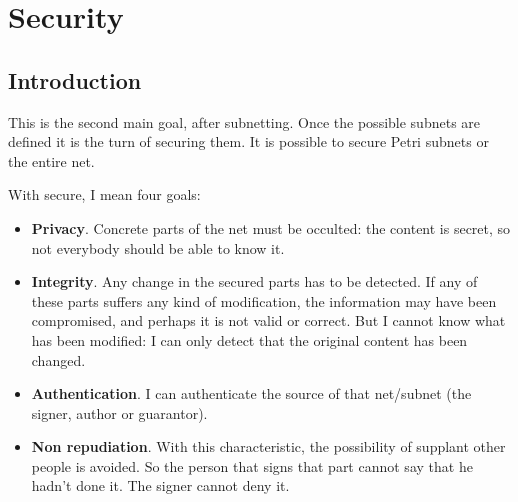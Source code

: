 
\chapter{Security} %

\label{Chapter: Security} %


\section{Introduction}

This is the second main goal, after subnetting. Once the possible subnets are defined it is the turn of securing them. It is possible to secure Petri subnets or the entire net.

With secure, I mean four goals:
\begin{itemize}
\item \textbf{Privacy}. Concrete parts of the net must be occulted: the content is secret, so not everybody should be able to know it.
\item \textbf{Integrity}. Any change in the secured parts has to be detected.
If any of these parts suffers any kind of modification, the information may have been compromised,
and perhaps it is not valid or correct. But I cannot know what has been modified:
I can only detect that the original content has been changed.
\item \textbf{Authentication}. I can authenticate the source of that net/subnet (the signer,
author or guarantor).
\item \textbf{Non repudiation}. With this characteristic, the possibility of supplant other people is avoided. So the person that signs that part cannot
say that he hadn't done it. The signer cannot deny  it. 

\end{itemize}


